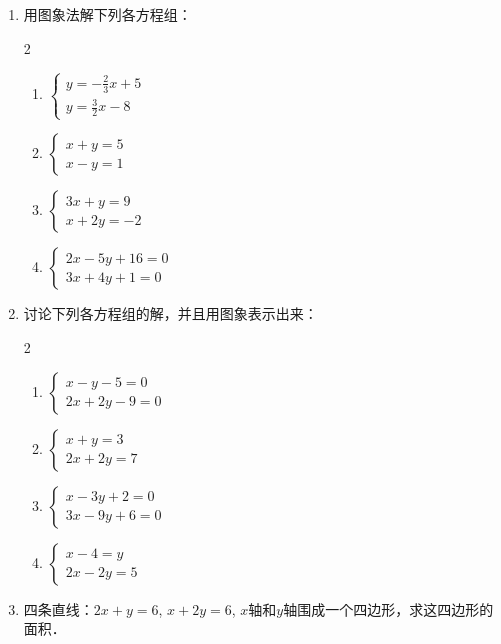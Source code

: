 \begin{enumerate}
\item     用图象法解下列各方程组：
  \begin{multicols}{2}
\begin{enumerate}
    \item $\begin{cases}
        y=-\frac{2}{3}x+5\\
        y=\frac{3}{2}x-8
    \end{cases}$
    \item $\begin{cases}
        x+y=5\\x-y=1
    \end{cases}$
    \item $\begin{cases}
        3x+y=9\\x+2y=-2
    \end{cases}$
    \item $\begin{cases}
        2x-5y+16=0\\3x+4y+1=0
    \end{cases}$
\end{enumerate}
\end{multicols}
    \item 讨论下列各方程组的解，并且用图象表示出来：
    \begin{multicols}{2}
        \begin{enumerate}
\item $\begin{cases}
    x-y-5=0\\2x+2y-9=0
\end{cases}$    
\item $\begin{cases}
     x+y=3\\2x+2y=7
\end{cases}$ 
\item $\begin{cases}
    x-3y+2=0\\3x-9y+6=0
\end{cases}$ 
\item $\begin{cases}
    x-4=y\\2x-2y=5
\end{cases}$ 
        \end{enumerate}
\end{multicols}
   
\item 四条直线：$2x+y=6$, $x+2y=6$, $x$轴和$y$轴围成一个四边形，求这四边形的面积．

\end{enumerate}

